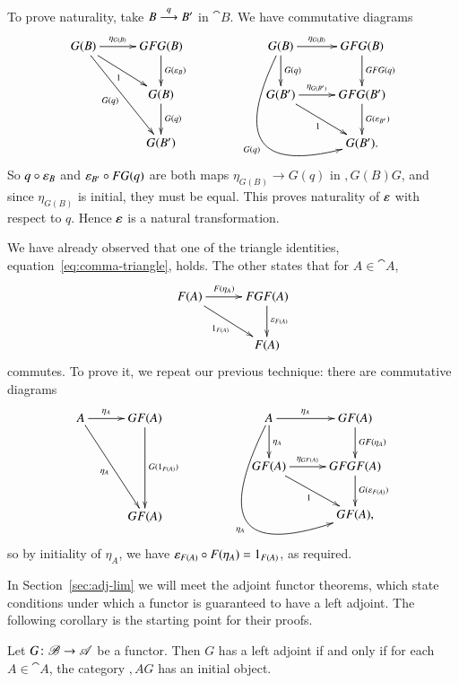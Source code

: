 \begin{pf}
To prove naturality, take $B \stackrel{q}{\longrightarrow} B'$ in $\cat{B}$.  We have commutative
diagrams 
\[
\xymatrix@C+1ex{
G(B) \ar[r]^-{\eta_{G(B)}} \ar[rd]_1 \ar[rdd]_{G(q)}     &
GFG(B) \ar[d]^{G(\epsln_B)}     \\
        &G(B) \ar[d]^{G(q)}     \\
        &G(B')
}
% 
\qquad\qquad
% 
\xymatrix@C+1ex{
G(B) \ar[r]^-{\eta_{G(B)}} \ar[d]^{G(q)} 
\ar@/^-5pc/[rdd]_{G(q)}  &
GFG(B) \ar[d]^{GFG(q)}  \\
G(B') \ar[r]^-{\eta_{G(B')}} \ar[rd]_1   &
GFG(B') \ar[d]^{G(\epsln_{B'})} \\
        &
G(B').
}
\]
So $q \mathbin{\circ} \varepsilon_B$ and $\varepsilon_{B'} \mathbin{\circ} FG(q)$ are both maps $\eta_{G(B)} \to
G(q)$ in $\comma{G(B)}{G}$, and since $\eta_{G(B)}$ is initial, they must be
equal.  This proves naturality of $\varepsilon$ with respect to $q$.  Hence
$\varepsilon$ is a natural transformation.

We have already observed that one of the triangle identities,
equation~\eqref{eq:comma-triangle}, holds.  The other states that for $A \in
\cat{A}$,
\[
\xymatrix@C+1ex{
F(A) \ar[r]^-{F(\eta_A)} \ar[rd]_{1_{F(A)}}      &
FGF(A) \ar[d]^{\epsln_{F(A)}}   \\
        &
F(A)
}
\]
commutes.  To prove it, we repeat our previous technique: there are
commutative diagrams
\[
\xymatrix@R+.5em@C+1ex{
A \ar[r]^-{\eta_A} \ar[rdd]_{\eta_A}     &
GF(A) \ar[dd]^{G(1_{F(A)})}     \\
        &       \\
        &GF(A)
}
% 
\qquad\qquad
% 
\xymatrix@C+1ex{
A \ar[r]^-{\eta_A} \ar[d]^{\eta_A}       
\ar@/^-5.7pc/[rdd]_{\eta_A}  &
GF(A) \ar[d]^{GF(\eta_A)}       \\
GF(A) \ar[r]^-{\eta_{GF(A)}} \ar[rd]_1   &
GFGF(A) \ar[d]^{G(\epsln_{F(A)})}       \\
        &
GF(A),
}
\]
so by initiality of $\eta_A$, we have $\varepsilon_{F(A)} \mathbin{\circ} F(\eta_A) =
1_{F(A)}$, as required.
\end{pf}

In Section~\ref{sec:adj-lim} we will meet the adjoint functor theorems,
which state conditions under which a functor is guaranteed to have a left
adjoint.  The following corollary is the starting point for their proofs.

\begin{cor}     
\label{cor:pre-AFT}
Let $G\from \cat{B} \to \cat{A}$ be a functor.  Then $G$ has a left adjoint if
and only if for each $A \in \cat{A}$, the category $\comma{A}{G}$ has an
initial object.
\end{cor}


